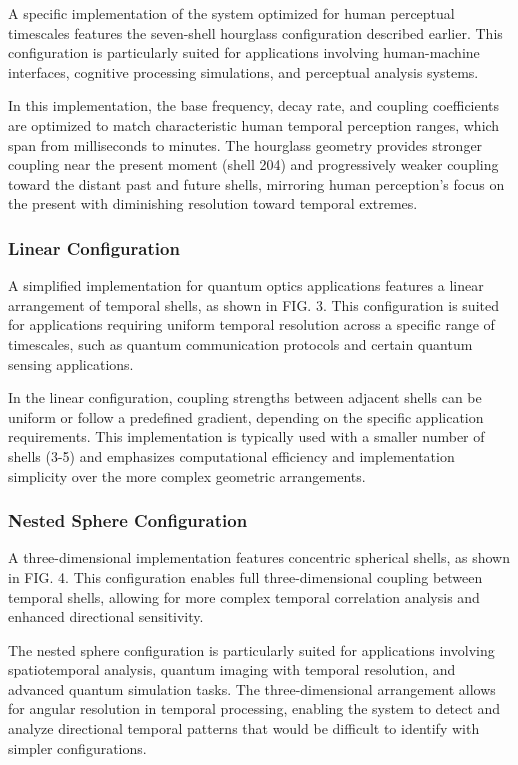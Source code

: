 \documentclass[12pt,letterpaper]{article}
\begin{document}
A specific implementation of the system optimized for human perceptual timescales features the seven-shell hourglass configuration described earlier. This configuration is particularly suited for applications involving human-machine interfaces, cognitive processing simulations, and perceptual analysis systems.

In this implementation, the base frequency, decay rate, and coupling coefficients are optimized to match characteristic human temporal perception ranges, which span from milliseconds to minutes. The hourglass geometry provides stronger coupling near the present moment (shell 204) and progressively weaker coupling toward the distant past and future shells, mirroring human perception's focus on the present with diminishing resolution toward temporal extremes.

\subsubsection{Linear Configuration}

A simplified implementation for quantum optics applications features a linear arrangement of temporal shells, as shown in FIG. 3. This configuration is suited for applications requiring uniform temporal resolution across a specific range of timescales, such as quantum communication protocols and certain quantum sensing applications.

In the linear configuration, coupling strengths between adjacent shells can be uniform or follow a predefined gradient, depending on the specific application requirements. This implementation is typically used with a smaller number of shells (3-5) and emphasizes computational efficiency and implementation simplicity over the more complex geometric arrangements.

\subsubsection{Nested Sphere Configuration}

A three-dimensional implementation features concentric spherical shells, as shown in FIG. 4. This configuration enables full three-dimensional coupling between temporal shells, allowing for more complex temporal correlation analysis and enhanced directional sensitivity.

The nested sphere configuration is particularly suited for applications involving spatiotemporal analysis, quantum imaging with temporal resolution, and advanced quantum simulation tasks. The three-dimensional arrangement allows for angular resolution in temporal processing, enabling the system to detect and analyze directional temporal patterns that would be difficult to identify with simpler configurations.
\end{document}
